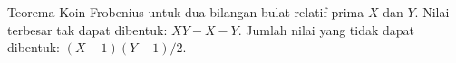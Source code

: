 Teorema Koin Frobenius untuk dua bilangan bulat relatif prima $X$ dan $Y$. \newline
Nilai terbesar tak dapat dibentuk: $XY - X - Y$. \newline
Jumlah nilai yang tidak dapat dibentuk: $(X - 1)(Y - 1) / 2$.
